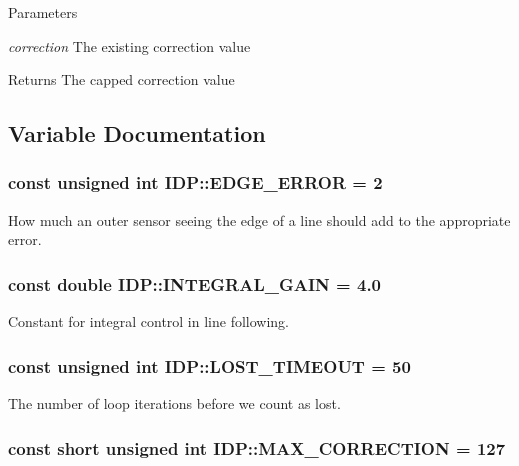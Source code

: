 \begin{DoxyParams}{Parameters}
\item[{\em correction}]The existing correction value \end{DoxyParams}
\begin{DoxyReturn}{Returns}
The capped correction value 
\end{DoxyReturn}


\subsection{Variable Documentation}
\hypertarget{namespaceIDP_afa01378acc238f4bd41d8eb304f7afd7}{
\subsubsection[{EDGE\_\-ERROR}]{\setlength{\rightskip}{0pt plus 5cm}const unsigned int {\bf IDP::EDGE\_\-ERROR} = 2}}
\label{namespaceIDP_afa01378acc238f4bd41d8eb304f7afd7}


How much an outer sensor seeing the edge of a line should add to the appropriate error. 

\hypertarget{namespaceIDP_a9107eef10d68ba30176633afd87f1ed4}{
\subsubsection[{INTEGRAL\_\-GAIN}]{\setlength{\rightskip}{0pt plus 5cm}const double {\bf IDP::INTEGRAL\_\-GAIN} = 4.0}}
\label{namespaceIDP_a9107eef10d68ba30176633afd87f1ed4}


Constant for integral control in line following. 

\hypertarget{namespaceIDP_ac845248570cca0705d43e2dbb085c3cb}{
\subsubsection[{LOST\_\-TIMEOUT}]{\setlength{\rightskip}{0pt plus 5cm}const unsigned int {\bf IDP::LOST\_\-TIMEOUT} = 50}}
\label{namespaceIDP_ac845248570cca0705d43e2dbb085c3cb}


The number of loop iterations before we count as lost. 

\hypertarget{namespaceIDP_a246919caaacabcb0399802d542d8330b}{
\subsubsection[{MAX\_\-CORRECTION}]{\setlength{\rightskip}{0pt plus 5cm}const short unsigned int {\bf IDP::MAX\_\-CORRECTION} = 127}}
\label{namespaceIDP_a246919caaacabcb0399802d542d8330b}


